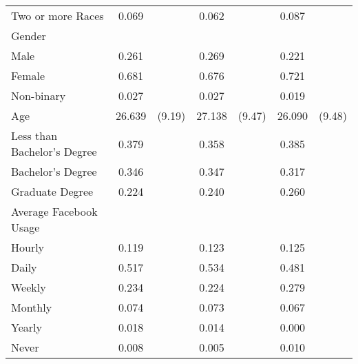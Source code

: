 {\begin{tabular}{l*{3}{cc}}
\hspace{3mm} Two or more Races&       0.069&            &       0.062&            &       0.087&            \\
Gender              &            &            &            &            &            &            \\
 \hspace{3mm} Male  &       0.261&            &       0.269&            &       0.221&            \\
 \hspace{3mm} Female&       0.681&            &       0.676&            &       0.721&            \\
 \hspace{3mm} Non-binary&       0.027&            &       0.027&            &       0.019&            \\
Age                 &      26.639&      (9.19)&      27.138&      (9.47)&      26.090&      (9.48)\\
Less than Bachelor's Degree&       0.379&            &       0.358&            &       0.385&            \\
Bachelor's Degree   &       0.346&            &       0.347&            &       0.317&            \\
Graduate Degree     &       0.224&            &       0.240&            &       0.260&            \\
Average Facebook Usage&            &            &            &            &            &            \\
\hspace{3mm} Hourly &       0.119&            &       0.123&            &       0.125&            \\
\hspace{3mm} Daily  &       0.517&            &       0.534&            &       0.481&            \\
\hspace{3mm} Weekly &       0.234&            &       0.224&            &       0.279&            \\
\hspace{3mm} Monthly&       0.074&            &       0.073&            &       0.067&            \\
\hspace{3mm} Yearly &       0.018&            &       0.014&            &       0.000&            \\
\hspace{3mm} Never  &       0.008&            &       0.005&            &       0.010&            \\

\end{tabular}}
